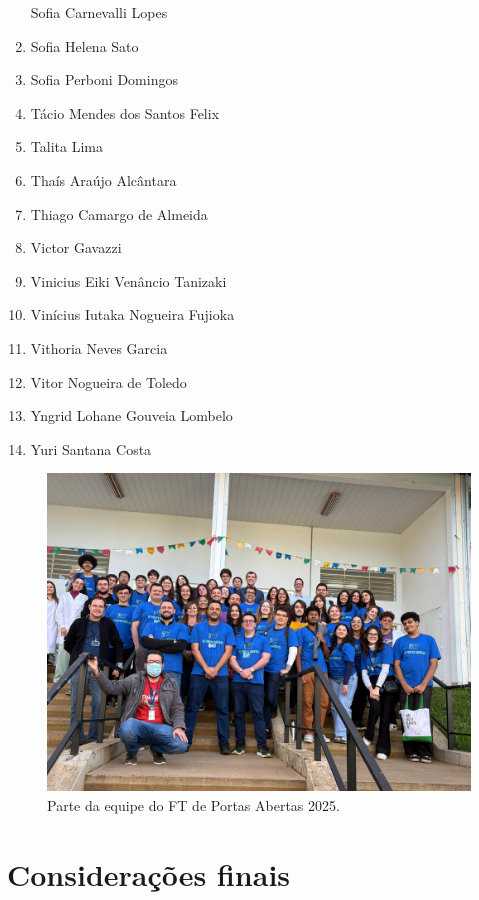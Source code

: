 \documentclass[
  letterpaper,
  DIV=11,
  numbers=noendperiod]{scrreprt}
\begin{document}
\begin{enumerate}
  Sofia Carnevalli Lopes
\item
  Sofia Helena Sato
\item
  Sofia Perboni Domingos
\item
  Tácio Mendes dos Santos Felix
\item
  Talita Lima
\item
  Thaís Araújo Alcântara
\item
  Thiago Camargo de Almeida
\item
  Victor Gavazzi
\item
  Vinicius Eiki Venâncio Tanizaki
\item
  Vinícius Iutaka Nogueira Fujioka
\item
  Vithoria Neves Garcia
\item
  Vitor Nogueira de Toledo
\item
  Yngrid Lohane Gouveia Lombelo
\item
  Yuri Santana Costa
\end{enumerate}

\begin{figure}[H]

{\centering \includegraphics[width=0.8\linewidth,height=\textheight,keepaspectratio]{agradecimentos/foto-equipe.jpg}

}

\caption{Parte da equipe do FT de Portas Abertas 2025.}

\end{figure}%


\chapter{Considerações finais}\label{considerauxe7uxf5es-finais}
\end{document}
